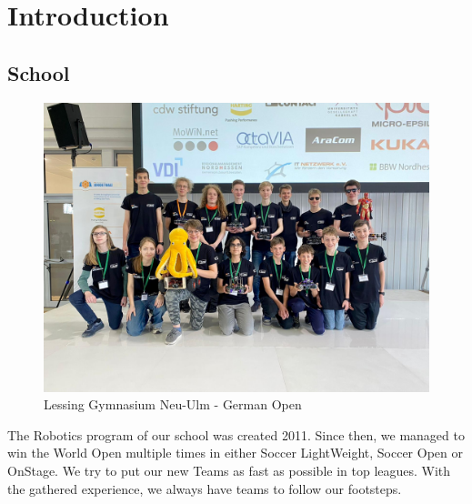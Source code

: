 \section{Introduction}

\subsection{School}
\begin{figure}[ht]
    \centering
    \includegraphics[width=\textwidth]{img/LGNU.jpg}
    \caption{Lessing Gymnasium Neu-Ulm - German Open}
    \label{fig:LGNU}
\end{figure}

The Robotics program of our school was created 2011. Since then, we managed to win the World Open
multiple times in either Soccer LightWeight, Soccer Open or OnStage.
We try to put our new Teams as fast as possible in top leagues. With the gathered experience, we always
have teams to follow our footsteps.
\newpage

